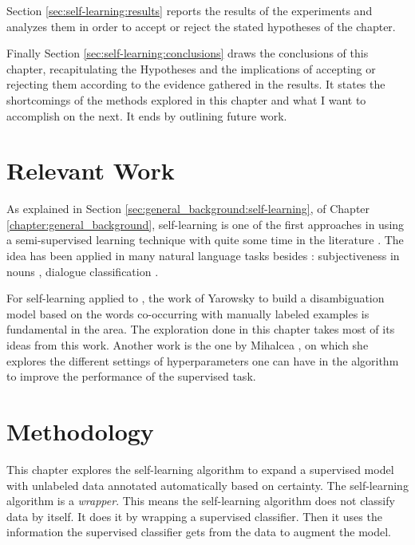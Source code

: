 Section \ref{sec:self-learning:results} reports the results of the experiments
and analyzes them in order to accept or reject the stated hypotheses of the
chapter.

Finally Section \ref{sec:self-learning:conclusions} draws the conclusions of
this chapter, recapitulating the Hypotheses and the implications of accepting
or rejecting them according to the evidence gathered in the results. It states
the shortcomings of the methods explored in this chapter and what I want to
accomplish on the next. It ends by outlining future work.

\section{Relevant Work}\label{sec:self-learning:previous}

As explained in Section \ref{sec:general_background:self-learning}, of Chapter
\ref{chapter:general_background}, self-learning is one of the first approaches
in using a semi-supervised learning technique with quite some time in the
literature \cite{Scudder:2006:PEA:2263254.2267291}. The idea has been applied
in many natural language tasks besides \wsd: subjectiveness in nouns
\cite{Riloff:2003:LSN:1119176.1119180}, dialogue classification
\cite{Maeireizo:2004:CPE:1219044.1219072}.

For self-learning applied to \wsd, the work of Yarowsky \cite{yarowsky-95} to
build a disambiguation model based on the words co-occurring with manually
labeled examples is fundamental in the area. The exploration done in this
chapter takes most of its ideas from this work. Another work is the one by
Mihalcea \cite{mihalcea:2004:CONLL}, on which she explores the different
settings of hyperparameters one can have in the algorithm to improve the
performance of the supervised task.

\section{Methodology}\label{sec:self-learning:methodology}

This chapter explores the self-learning algorithm to expand a supervised model
with unlabeled data annotated automatically based on certainty. The
self-learning algorithm is a {\em wrapper}. This means the self-learning
algorithm does not classify data by itself. It does it by wrapping a supervised
classifier. Then it uses the information the supervised classifier gets from
the data to augment the model.

